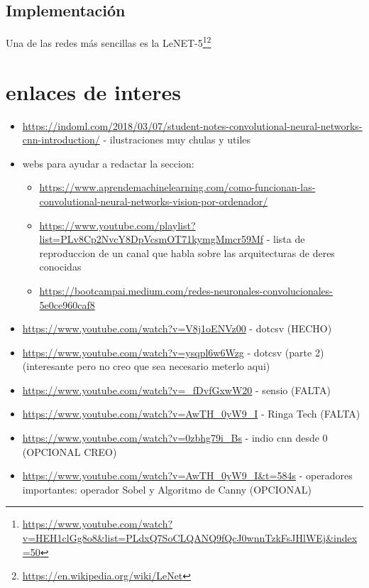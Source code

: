 \documentclass{article}
\begin{document}
\subsection{Implementación}
Una de las redes más sencillas es la LeNET-5\footnote{\url{https://www.youtube.com/watch?v=HEH1clGg8o8&list=PLdxQ7SoCLQANQ9fQcJ0wnnTzkFsJHlWEj&index=50}}\footnote{\url{https://en.wikipedia.org/wiki/LeNet}}


\section{enlaces de interes}
\begin{itemize}
\item \url{https://indoml.com/2018/03/07/student-notes-convolutional-neural-networks-cnn-introduction/} - ilustraciones muy chulas y utiles

\item webs para ayudar a redactar la seccion:
\begin{itemize}
\item \url{https://www.aprendemachinelearning.com/como-funcionan-las-convolutional-neural-networks-vision-por-ordenador/}
\item \url{https://www.youtube.com/playlist?list=PLv8Cp2NvcY8DpVcsmOT71kymgMmcr59Mf} - lista de reproduccion de un canal que habla sobre las arquitecturas de deres conocidas
\item \url{https://bootcampai.medium.com/redes-neuronales-convolucionales-5e0ce960caf8}
\end{itemize}
\item \url{https://www.youtube.com/watch?v=V8j1oENVz00} - dotcsv (HECHO)
\item \url{https://www.youtube.com/watch?v=ysqpl6w6Wzg} - dotcsv (parte 2) (interesante pero no creo que sea necesario meterlo aqui)
\item \url{https://www.youtube.com/watch?v=_fDvfGxwW20} - sensio (FALTA)
\item \url{https://www.youtube.com/watch?v=AwTH_0yW9_I} - Ringa Tech (FALTA)
\item \url{https://www.youtube.com/watch?v=0zbhg79i_Bs} - indio cnn desde 0 (OPCIONAL CREO)
\item \url{https://www.youtube.com/watch?v=AwTH_0yW9_I&t=584s} - operadores importantes: operador Sobel y Algoritmo de Canny (OPCIONAL)
\end{itemize}
\end{document}
